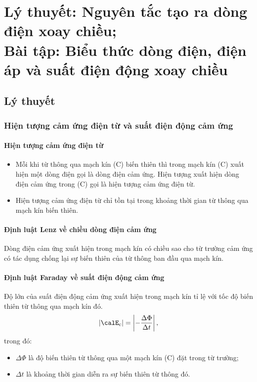 
\chapter[Lý thuyết: Nguyên tắc tạo ra dòng điện xoay chiều;\\Bài tập: Biểu thức dòng điện, điện áp và suất điện động xoay chiều]{Lý thuyết: Nguyên tắc tạo ra dòng điện xoay chiều;\\Bài tập: Biểu thức dòng điện, điện áp và suất điện động xoay chiều}
\section{Lý thuyết}
\subsection{Hiện tượng cảm ứng điện từ và suất điện động cảm ứng}
\subsubsection{Hiện tượng cảm ứng điện từ}
\begin{itemize}
	\item Mỗi khi từ thông qua mạch kín (C) biến thiên thì trong mạch kín (C) xuất hiện một dòng điện gọi là dòng điện cảm ứng. Hiện tượng xuất hiện dòng điện cảm ứng trong (C) gọi là hiện tượng cảm ứng điện từ.
	\item Hiện tượng cảm ứng điện từ chỉ tồn tại trong khoảng thời gian từ thông qua mạch kín biến thiên.
\end{itemize}
\subsubsection{Định luật Lenz về chiều dòng điện cảm ứng}
Dòng điện cảm ứng xuất hiện trong mạch kín có chiều sao cho từ trường cảm ứng có tác dụng chống lại sự biến thiên của từ thông ban đầu qua mạch kín.
\subsubsection{Định luật Faraday về suất điện động cảm ứng}
Độ lớn của suất điện động cảm ứng xuất hiện trong mạch kín tỉ lệ với tốc độ biến thiên từ thông qua mạch kín đó.
\begin{equation*}
	|\calE_\text c| = \left|-\dfrac{\Delta \Phi}{\Delta t}\right|,
\end{equation*}
trong đó:
\begin{itemize}
	\item $\Delta \Phi$ là độ biến thiên từ thông qua một mạch kín (C) đặt trong từ trường;
	\item $\Delta t$ là khoảng thời gian diễn ra sự biến thiên từ thông đó.
\end{itemize}
